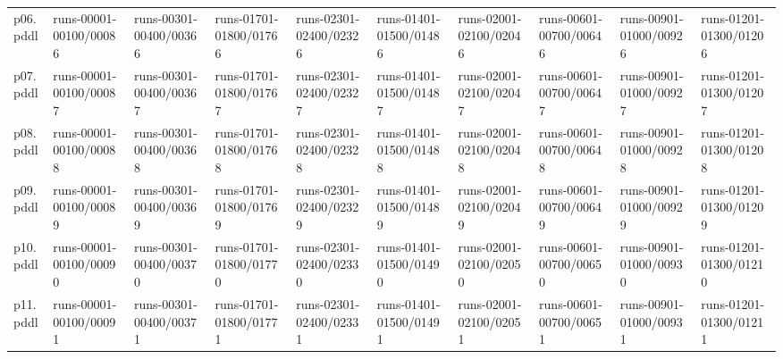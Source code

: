 \documentclass{article}
\begin{document}
\begin{tabular}{@{}lrrrrrrrrr@{}}
p06.pddl & \multicolumn{1}{|l|}{runs-00001-00100/00086} & \multicolumn{1}{|l|}{runs-00301-00400/00366} & \multicolumn{1}{|l|}{runs-01701-01800/01766} & \multicolumn{1}{|l|}{runs-02301-02400/02326} & \multicolumn{1}{|l|}{runs-01401-01500/01486} & \multicolumn{1}{|l|}{runs-02001-02100/02046} & \multicolumn{1}{|l|}{runs-00601-00700/00646} & \multicolumn{1}{|l|}{runs-00901-01000/00926} & \multicolumn{1}{|l|}{runs-01201-01300/01206} \\
p07.pddl & \multicolumn{1}{|l|}{runs-00001-00100/00087} & \multicolumn{1}{|l|}{runs-00301-00400/00367} & \multicolumn{1}{|l|}{runs-01701-01800/01767} & \multicolumn{1}{|l|}{runs-02301-02400/02327} & \multicolumn{1}{|l|}{runs-01401-01500/01487} & \multicolumn{1}{|l|}{runs-02001-02100/02047} & \multicolumn{1}{|l|}{runs-00601-00700/00647} & \multicolumn{1}{|l|}{runs-00901-01000/00927} & \multicolumn{1}{|l|}{runs-01201-01300/01207} \\
p08.pddl & \multicolumn{1}{|l|}{runs-00001-00100/00088} & \multicolumn{1}{|l|}{runs-00301-00400/00368} & \multicolumn{1}{|l|}{runs-01701-01800/01768} & \multicolumn{1}{|l|}{runs-02301-02400/02328} & \multicolumn{1}{|l|}{runs-01401-01500/01488} & \multicolumn{1}{|l|}{runs-02001-02100/02048} & \multicolumn{1}{|l|}{runs-00601-00700/00648} & \multicolumn{1}{|l|}{runs-00901-01000/00928} & \multicolumn{1}{|l|}{runs-01201-01300/01208} \\
p09.pddl & \multicolumn{1}{|l|}{runs-00001-00100/00089} & \multicolumn{1}{|l|}{runs-00301-00400/00369} & \multicolumn{1}{|l|}{runs-01701-01800/01769} & \multicolumn{1}{|l|}{runs-02301-02400/02329} & \multicolumn{1}{|l|}{runs-01401-01500/01489} & \multicolumn{1}{|l|}{runs-02001-02100/02049} & \multicolumn{1}{|l|}{runs-00601-00700/00649} & \multicolumn{1}{|l|}{runs-00901-01000/00929} & \multicolumn{1}{|l|}{runs-01201-01300/01209} \\
p10.pddl & \multicolumn{1}{|l|}{runs-00001-00100/00090} & \multicolumn{1}{|l|}{runs-00301-00400/00370} & \multicolumn{1}{|l|}{runs-01701-01800/01770} & \multicolumn{1}{|l|}{runs-02301-02400/02330} & \multicolumn{1}{|l|}{runs-01401-01500/01490} & \multicolumn{1}{|l|}{runs-02001-02100/02050} & \multicolumn{1}{|l|}{runs-00601-00700/00650} & \multicolumn{1}{|l|}{runs-00901-01000/00930} & \multicolumn{1}{|l|}{runs-01201-01300/01210} \\
p11.pddl & \multicolumn{1}{|l|}{runs-00001-00100/00091} & \multicolumn{1}{|l|}{runs-00301-00400/00371} & \multicolumn{1}{|l|}{runs-01701-01800/01771} & \multicolumn{1}{|l|}{runs-02301-02400/02331} & \multicolumn{1}{|l|}{runs-01401-01500/01491} & \multicolumn{1}{|l|}{runs-02001-02100/02051} & \multicolumn{1}{|l|}{runs-00601-00700/00651} & \multicolumn{1}{|l|}{runs-00901-01000/00931} & \multicolumn{1}{|l|}{runs-01201-01300/01211} \\

\end{tabular}
\end{document}

